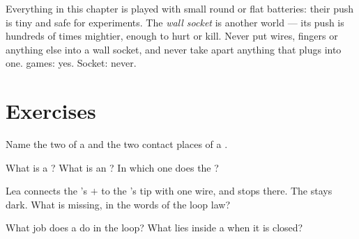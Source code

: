 \begin{remark}\label{rem:g3:first-electric-circuit:safety}
Everything in this chapter is played with small round or flat
batteries: their push is tiny and safe for experiments. The
\emph{wall socket} is another world --- its push is hundreds of
times mightier, enough to hurt or kill. Never put wires, fingers or
anything else into a wall socket, and never take apart anything that
plugs into one.  games: yes. Socket: never.
\end{remark}

\section{Exercises}

\begin{exercise}[$\star$]\label{exo:g3:first-electric-circuit:1}
Name the two  of a  and the two contact places of a
.
\end{exercise}

\begin{exercise}[$\star$]\label{exo:g3:first-electric-circuit:2}
What is a ? What is an ? In which one does
the  ?
\end{exercise}

\begin{exercise}[$\star$]\label{exo:g3:first-electric-circuit:3}
Lea connects the 's $+$  to the 's tip with one
wire, and stops there. The  stays dark. What is missing, in the
words of the loop law?
\end{exercise}

\begin{exercise}[$\star$]\label{exo:g3:first-electric-circuit:4}
What job does a  do in the loop? What lies inside a 
when it is closed?
\end{exercise}

